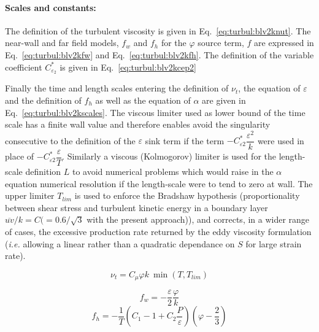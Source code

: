 \paragraph{Scales and constants:}

The definition of the turbulent viscosity is given in Eq.~\eqref{eq:turbul:blv2knut}. 
The near-wall and far field models, $f_w$ and $f_h$ for the $\varphi$ source term, $f$ are 
expressed in Eq.~\eqref{eq:turbul:blv2kfw} and Eq.~\eqref{eq:turbul:blv2kfh}. 
The definition of the variable coefficient $C_{\varepsilon_2}^*$ is given in Eq.~\eqref{eq:turbul:blv2kcep2}

Finally the time and length scales entering the definition of $\nu_t$, the equation of 
$\varepsilon$ and the definition of $f_h$ as well as the equation of $\alpha$ are given in 
Eq.~\eqref{eq:turbul:blv2kscales}. The viscous limiter used as lower bound of the time scale 
has a finite wall value and therefore enables avoid the singularity consecutive to the definition 
of the $\varepsilon$ sink term if the term $-C_{\varepsilon 2}^* \dfrac{\varepsilon^2}{k}$ were 
used in place of $-C_{\varepsilon 2}^* \dfrac{\varepsilon}{T}$. 
Similarly a viscous (Kolmogorov) limiter is used for the length-scale definition $L$ to 
avoid numerical problems which would raise in the $\alpha$ equation numerical resolution 
if the length-scale were to tend to zero at wall. The upper limiter $T_{lim}$ is used to 
enforce the Bradshaw hypothesis (proportionality between shear stress and turbulent 
kinetic energy in a boundary layer $\overline{uv}/k=C (=0.6/\sqrt{3}$ with the present approach)), 
and corrects, in a wider range of cases, the excessive production rate returned by 
the eddy viscosity formulation (\emph{i.e.} allowing a linear rather than a quadratic 
dependance on $S$ for large strain rate).

\begin{equation}
	\nu_t= C_\mu \varphi k ~ \min(T,T_{lim})
\label{eq:turbul:blv2knut}
\end{equation}

\begin{equation}
f_w = - \dfrac{\varepsilon}{2} \dfrac{\varphi}{k}
\label{eq:turbul:blv2kfw}
\end{equation}
\begin{equation}
f_h = - \dfrac{1}{T} \left(  C_1 -1 +C_2 \dfrac{P}{\varepsilon}   \right) \left(  \varphi - \dfrac{2}{3}  \right)
\label{eq:turbul:blv2kfh}
\end{equation}

